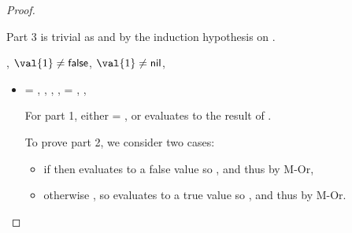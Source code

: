 \begin{lemma}
\begin{proof}
\begin{case}[B-IfFalse]
\begin{itemize}
\begin{subcase}[T-If]
              Part 3 is trivial as
              \opsem {\openv{}} {} {\val{}}
              and {\judgementtwo{}{\val{}}{\ty{}}} by the induction hypothesis on {}.
      \end{subcase}
  \end{itemize}
\end{case}

\begin{case}[B-IfTrue]
        \opsem {\openv{}} {} {},
              ${\val{1}} \not= {\false}$,
              ${\val{1}} \not= {\nil}$,
              \opsem {\openv{}} {} {\val{}}

  \begin{itemize}
    \item[]
      \begin{subcase}[T-If]
        \ep{} = { {} {}},
        \judgementrewrite {\propenv{}} {} {} { {}}
                 {}
                 {},
                 {} {\ty{}} { {}}
                 {\object{}}
                 {},
                 {} {\ty{}} { {}}
                 {\object{}}
                 {},
        \e{} = { {} {}},
  ,

              For part 1, either \object{} = \emptyobject{}, or \e{} evaluates to the
              result of .

              To prove part 2, we consider two cases:
              \begin{itemize}
                \item if \isfalseval{\val{}}
                  then  evaluates to a false value so {}, and thus
                  {} by M-Or, 
                \item otherwise
                  \istrueval{\val{}},
                  so  evaluates to a true value so {}, and thus
                  {} by M-Or.
              \end{itemize}


\end{subcase}
\end{itemize}
\end{case}
\end{proof}
\end{lemma}
